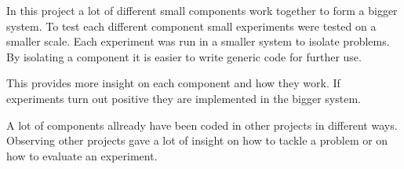 
In this project a lot of different small components work together to form
a bigger system. To test each different component small experiments were tested on a 
smaller scale. Each experiment was run in a smaller system to isolate problems. By isolating a component
it is easier to write generic code for further use.

This provides more insight on each component and how they work. If experiments turn out positive 
they are implemented in the bigger system.


A lot of components allready have been coded in other projects in different ways. Observing
other projects gave a lot of insight on how to tackle a problem or on how to evaluate an experiment. 





